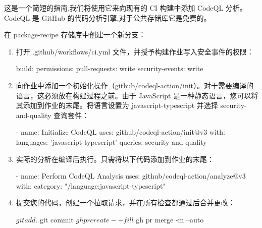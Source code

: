 这是一个简短的指南,我们将使用它来向现有的 CI 构建中添加 CodeQL 分析。CodeQL 是 GitHub 的代码分析引擎,对于公共存储库它是免费的。


在 package-recipe 存储库中创建一个新分支：



\begin{enumerate}
\item 
打开 .github/workflows/ci.yml 文件，并授予构建作业写入安全事件的权限：

\begin{shell}
build:
  permissions:
    pull-requests: write
    security-events: write
\end{shell}

\item 
向作业中添加一个初始化操作（github/codeql-action/init）。对于需要编译的语言，这必须放在构建过程之前。由于 JavaScript 是一种静态语言，您可以将其添加到作业的末尾。将语言设置为 javascript-typescript 并选择 security-and-quality 查询套件：

\begin{shell}
    - name: Initialize CodeQL
      uses: github/codeql-action/init@v3
      with:
        languages: 'javascript-typescript'
        queries: security-and-quality
\end{shell}

\item 
实际的分析在编译后执行。只需将以下代码添加到作业的末尾：

\begin{shell}
    - name: Perform CodeQL Analysis
      uses: github/codeql-action/analyze@v3
      with:
        category: "/language:javascript-typescript"
\end{shell}

\item 
提交您的代码，创建一个拉取请求，并在所有检查都通过后合并更改：

\begin{shell}
$ git add .
$ git commit
$ gh pr create --fill
$ gh pr merge -m --auto
\end{shell}
\end{enumerate}


